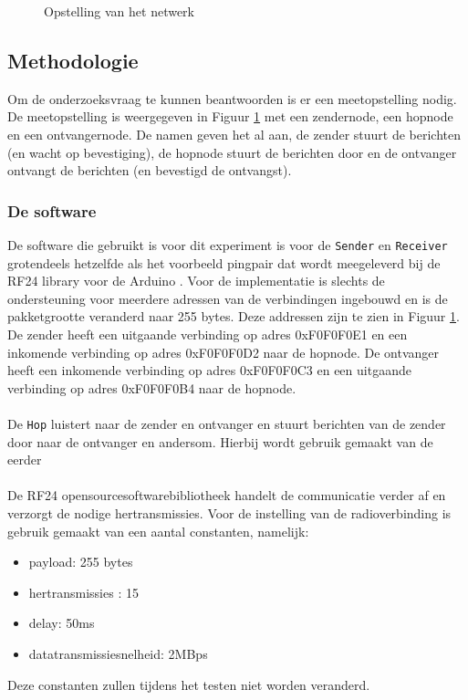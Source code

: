 \documentclass{article}
\begin{document}
\begin{figure}
\centering 
{} 
\caption{Opstelling van het netwerk}
\label{fig:hop} %
\end{figure}

\subsection{Methodologie}
Om de onderzoeksvraag te kunnen beantwoorden is er een meetopstelling nodig. De meetopstelling is weergegeven in Figuur \ref{fig:hop} met een zendernode, een hopnode en een ontvangernode. De namen geven het al aan, de zender stuurt de berichten (en wacht op bevestiging), de hopnode stuurt de berichten door en de ontvanger ontvangt de berichten (en bevestigd de ontvangst).  

\subsubsection{De software}

De software die gebruikt is voor dit experiment is voor de 
\texttt{Sender} en \texttt{Receiver} grotendeels hetzelfde als het voorbeeld pingpair dat wordt meegeleverd bij de RF24 library voor de Arduino \cite{rf24}. Voor de implementatie is slechts de ondersteuning voor meerdere adressen van de verbindingen ingebouwd en is de pakketgrootte veranderd naar 255 bytes. Deze addressen zijn te zien in Figuur \ref{fig:hop}. De zender heeft een uitgaande verbinding op adres 0xF0F0F0E1 en een inkomende verbinding op adres 0xF0F0F0D2 naar de hopnode. De ontvanger heeft een inkomende verbinding op adres 0xF0F0F0C3 en een uitgaande verbinding op adres 0xF0F0F0B4 naar de hopnode.\\
\\
De \texttt{Hop} luistert naar de zender en ontvanger en stuurt berichten van de zender door naar de ontvanger en andersom. Hierbij wordt gebruik gemaakt van de eerder \\
\\
De RF24 opensourcesoftwarebibliotheek handelt de communicatie verder af en verzorgt de nodige hertransmissies. Voor de instelling van de radioverbinding is gebruik gemaakt van een aantal constanten, namelijk:

\begin{itemize}
	\item payload: 255 bytes
	\item hertransmissies : 15
	\item delay: 50ms
	\item datatransmissiesnelheid: 2MBps
\end{itemize}  
Deze constanten zullen tijdens het testen niet worden veranderd.
\end{document}
